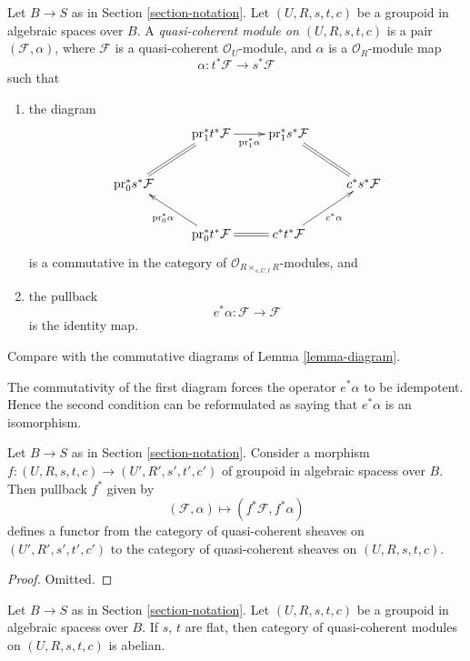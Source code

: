 \begin{definition}
\label{definition-groupoid-module}
Let $B \to S$ as in Section \ref{section-notation}.
Let $(U, R, s, t, c)$ be a groupoid in algebraic spaces over $B$.
A {\it quasi-coherent module on $(U, R, s, t, c)$}
is a pair $(\mathcal{F}, \alpha)$, where $\mathcal{F}$ is a quasi-coherent
$\mathcal{O}_U$-module, and $\alpha$ is a $\mathcal{O}_R$-module
map
$$
\alpha : t^*\mathcal{F} \longrightarrow s^*\mathcal{F}
$$
such that
\begin{enumerate}
\item the diagram
$$
\xymatrix{
& \text{pr}_1^*t^*\mathcal{F} \ar[r]_-{\text{pr}_1^*\alpha} &
\text{pr}_1^*s^*\mathcal{F} \ar@{=}[rd] & \\
\text{pr}_0^*s^*\mathcal{F} \ar@{=}[ru] & & & c^*s^*\mathcal{F} \\
& \text{pr}_0^*t^*\mathcal{F} \ar[lu]^{\text{pr}_0^*\alpha} \ar@{=}[r] &
c^*t^*\mathcal{F} \ar[ru]_{c^*\alpha}
}
$$
is a commutative in the category of
$\mathcal{O}_{R \times_{s, U, t} R}$-modules, and
\item the pullback
$$
e^*\alpha : \mathcal{F} \longrightarrow \mathcal{F}
$$
is the identity map.
\end{enumerate}
Compare with the commutative diagrams of Lemma \ref{lemma-diagram}.
\end{definition}

\noindent
The commutativity of the first diagram forces the operator $e^*\alpha$
to be idempotent. Hence the second condition can be reformulated as saying
that $e^*\alpha$ is an isomorphism.

\begin{lemma}
\label{lemma-pullback}
Let $B \to S$ as in Section \ref{section-notation}.
Consider a morphism
$f : (U, R, s, t, c) \to (U', R', s', t', c')$
of groupoid in algebraic spacess over $B$. Then pullback $f^*$ given by
$$
(\mathcal{F}, \alpha) \mapsto (f^*\mathcal{F}, f^*\alpha)
$$
defines a functor from the category of quasi-coherent sheaves on
$(U', R', s', t', c')$ to the category of quasi-coherent sheaves on
$(U, R, s, t, c)$.
\end{lemma}

\begin{proof}
Omitted.
\end{proof}

\begin{lemma}
\label{lemma-abelian}
Let $B \to S$ as in Section \ref{section-notation}.
Let $(U, R, s, t, c)$ be a groupoid in algebraic spacess over $B$.
If $s$, $t$ are flat, then category of quasi-coherent modules on
$(U, R, s, t, c)$ is abelian.
\end{lemma}

